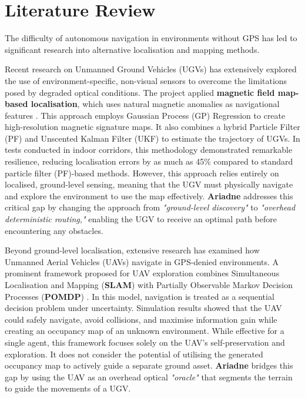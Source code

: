 \documentclass[12pt, a4paper]{article}
\begin{document}
\newpage

\section{Literature Review}

The difficulty of autonomous navigation in environments without GPS has led to significant research into alternative localisation and mapping methods. 

\vspace{0.5cm}

Recent research on Unmanned Ground Vehicles (UGVs) has extensively explored the use of environment-specific, non-visual sensors to overcome the limitations posed by degraded optical conditions. The project applied \textbf{magnetic field map-based localisation}, which uses natural magnetic anomalies as navigational features \cite{11219502}. This approach employs Gaussian Process (GP) Regression to create high-resolution magnetic signature maps. It also combines a hybrid Particle Filter (PF) and Unscented Kalman Filter (UKF) to estimate the trajectory of UGVs. In tests conducted in indoor corridors, this methodology demonstrated remarkable resilience, reducing localisation errors by as much as 45\% compared to standard particle filter (PF)-based methods. However, this approach relies entirely on localised, ground-level sensing, meaning that the UGV must physically navigate and explore the environment to use the map effectively. \textbf{Ariadne} addresses this critical gap by changing the approach from \textit{"ground-level discovery"} to \textit{"overhead deterministic routing,"} enabling the UGV to receive an optimal path before encountering any obstacles.

\vspace{0.5cm}

Beyond ground-level localisation, extensive research has examined how Unmanned Aerial Vehicles (UAVs) navigate in GPS-denied environments. A prominent framework proposed for UAV exploration combines Simultaneous Localisation and Mapping (\textbf{SLAM}) with Partially Observable Markov Decision Processes (\textbf{POMDP}) \cite{8741612}. In this model, navigation is treated as a sequential decision problem under uncertainty. Simulation results showed that the UAV could safely navigate, avoid collisions, and maximise information gain while creating an occupancy map of an unknown environment. While effective for a single agent, this framework focuses solely on the UAV’s self-preservation and exploration. It does not consider the potential of utilising the generated occupancy map to actively guide a separate ground asset. \textbf{Ariadne} bridges this gap by using the UAV as an overhead optical \textit{"oracle"} that segments the terrain to guide the movements of a UGV.
\end{document}
